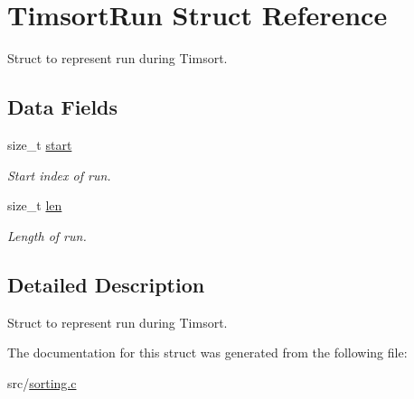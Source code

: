 \hypertarget{structTimsortRun}{}\section{Timsort\+Run Struct Reference}
\label{structTimsortRun}


Struct to represent run during Timsort.  


\subsection*{Data Fields}
\begin{DoxyCompactItemize}
\item 
\mbox{\label{structTimsortRun_a8e8eeaff3401b5d5f29b73f9007475b5}} 
size\+\_\+t \hyperlink{structTimsortRun_a8e8eeaff3401b5d5f29b73f9007475b5}{start}
\begin{DoxyCompactList}\small\item\em Start index of run. \end{DoxyCompactList}\item 
\mbox{\label{structTimsortRun_a90c1a2b4de2a6132ba3e1a06ce8d715f}} 
size\+\_\+t \hyperlink{structTimsortRun_a90c1a2b4de2a6132ba3e1a06ce8d715f}{len}
\begin{DoxyCompactList}\small\item\em Length of run. \end{DoxyCompactList}\end{DoxyCompactItemize}


\subsection{Detailed Description}
Struct to represent run during Timsort. 

The documentation for this struct was generated from the following file\+:\begin{DoxyCompactItemize}
\item 
src/\hyperlink{sorting_8c}{sorting.\+c}\end{DoxyCompactItemize}
